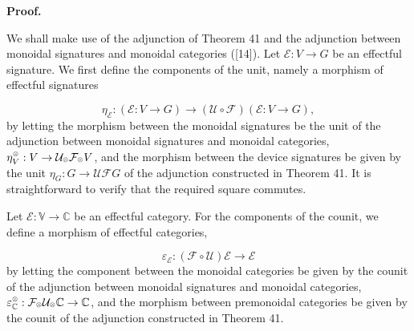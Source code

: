 \documentclass[10pt,a4paper]{article}
\begin{document}
 
 
 
 
 
\par\medskip\noindent\textbf{Proof.}\par
 
 
We shall make use of the adjunction of Theorem 41 and the adjunction between monoidal signatures and monoidal categories ([14]). Let $\mathcal{E}:V\to G$ be an effectful signature. We first define the components of the unit, namely a morphism of effectful signatures\par
    \[\eta_{\mathcal{E}}:(\mathcal{E}:V\to G)\to(\mathscr{U}\circ\mathscr{F})(\mathcal{E}:V\to G),\]    
by letting the morphism between the monoidal signatures be the unit of the adjunction between monoidal signatures and monoidal categories, $\eta^{\mathbin{\raisebox{1.25pt}{$\scriptscriptstyle\otimes$}}}_{V}:V\to\mathcal{U}_{\mathbin{\raisebox{1.25pt}{$\scriptscriptstyle\otimes$}}}\mathcal{F}_{\mathbin{\raisebox{1.25pt}{$\scriptscriptstyle\otimes$}}}V$, and the morphism between the device signatures be given by the unit $\eta_{G}:G\to\mathcal{U}\mathcal{F}G$ of the adjunction constructed in Theorem 41. It is straightforward to verify that the required square commutes.\par
 
 
 
Let $\mathscr{E}:\mathbb{V}\to\mathbb{C}$ be an effectful category. For the components of the counit, we define a morphism of effectful categories,\par
    \[\varepsilon_{\mathscr{E}}:(\mathscr{F}\circ\mathscr{U})\mathscr{E}\to\mathscr{E}\]    
by letting the component between the monoidal categories be given by the counit of the adjunction between monoidal signatures and monoidal categories, $\varepsilon^{\mathbin{\raisebox{1.25pt}{$\scriptscriptstyle\otimes$}}}_{\mathbb{C}}:\mathcal{F}_{\mathbin{\raisebox{1.25pt}{$\scriptscriptstyle\otimes$}}}\mathcal{U}_{\mathbin{\raisebox{1.25pt}{$\scriptscriptstyle\otimes$}}}\mathbb{C}\to\mathbb{C}$, and the morphism between premonoidal categories be given by the counit of the adjunction constructed in Theorem 41.\par
 
\end{document}
